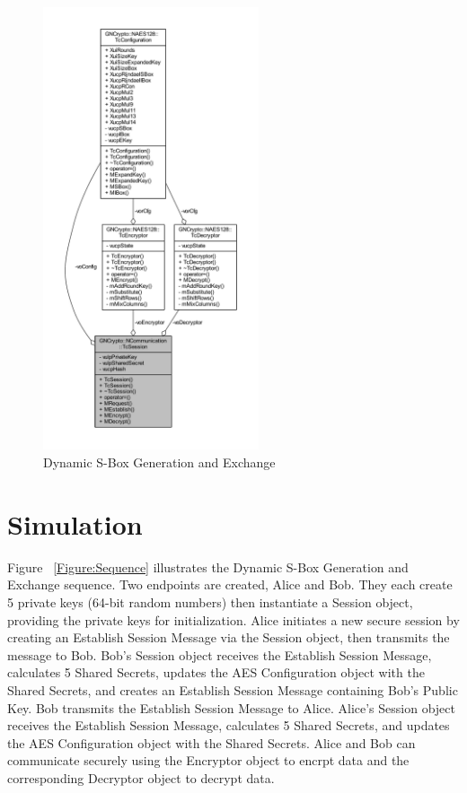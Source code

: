 \documentclass[journal]{IEEEtran}
\begin{document}
\begin{figure}[!t]
	\centering
	\includegraphics[width=2.5in]{CollaborationSession}
	\caption{Dynamic S-Box Generation and Exchange}
	\label{Figure:CollaborationSession}
\end{figure}

\section{Simulation}
Figure ~\ref{Figure:Sequence} illustrates the Dynamic S-Box Generation and Exchange sequence. Two endpoints are created, Alice and Bob. They each create 5 private keys (64-bit random numbers) then instantiate a Session object, providing the private keys for initialization. Alice initiates a new secure session by creating an Establish Session Message via the Session object, then transmits the message to Bob. Bob's Session object receives the Establish Session Message, calculates 5 Shared Secrets, updates the AES Configuration object with the Shared Secrets, and creates an Establish Session Message containing Bob's Public Key. Bob transmits the Establish Session Message to Alice. Alice's Session object receives the Establish Session Message, calculates 5 Shared Secrets, and updates the AES Configuration object with the Shared Secrets. Alice and Bob can communicate securely using the Encryptor object to encrpt data and the corresponding Decryptor object to decrypt data.
\end{document}
